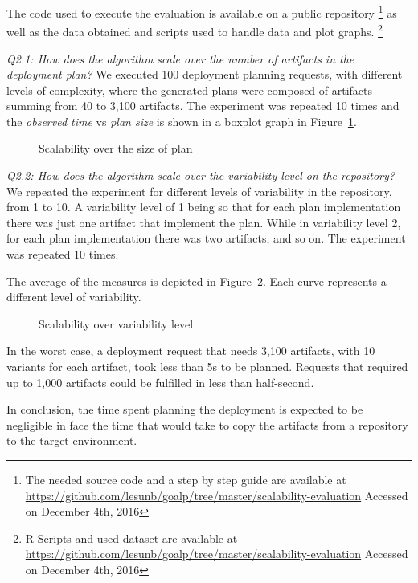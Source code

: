 The code used to execute the evaluation is available on a public repository
\footnote{The needed source code and a step by step guide are available at
\url{https://github.com/lesunb/goalp/tree/master/scalability-evaluation} Accessed on December 4th, 2016}
as well as
the data obtained and scripts used to handle data and plot graphs.
\footnote{R Scripts\cite{the_r_foundation_r_2016} and used dataset are available at
\url{https://github.com/lesunb/goalp/tree/master/scalability-evaluation} Accessed on December 4th, 2016}

\emph{Q2.1: How does the algorithm scale over the number of artifacts in the deployment plan?} We executed 100 deployment planning requests, with different levels of complexity, where the generated plans were composed of artifacts summing from 40 to 3,100 artifacts. The experiment was repeated 10 times and the \emph{observed time} vs \emph{plan size} is shown in a boxplot graph in Figure~\ref{graph_plan_size_and_time}.

\begin{figure}[!htb]
  \centering
  \caption{Scalability over the size of plan}
\label{graph_plan_size_and_time}
\end{figure}


\emph{Q2.2:  How does the algorithm scale over the variability level on the repository?}
We repeated the experiment for different levels of variability in the repository, from 1 to 10. A variability level of 1 being so that for each plan implementation there was just one artifact that implement the plan. While in variability level 2, for each plan implementation there was two artifacts, and so on. The experiment was repeated 10 times.

The average of the measures is depicted in Figure~\ref{graph_scalability}. Each curve represents a different level of variability.

\begin{figure}[!htb]
  \centering
  \caption{Scalability over variability level}
\label{graph_scalability}
\end{figure}

In the worst case, a deployment request that needs 3,100 artifacts, with 10 variants for each artifact, took less than 5s to be planned. Requests that required up to 1,000 artifacts could be fulfilled in less than half-second.

In conclusion, the time spent planning the deployment is expected to be negligible in face the time that would take to copy the artifacts from a repository to the target environment.

